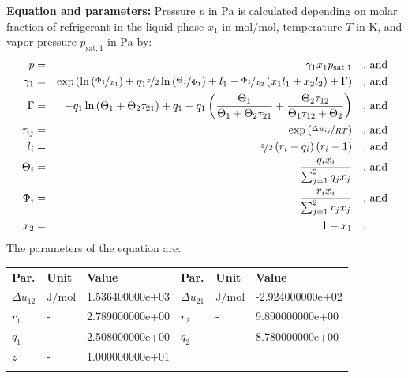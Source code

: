 \textbf{Equation and parameters:}
\newline
%
Pressure $p$ in $\si{\pascal}$ is calculated depending on molar fraction of refrigerant in the liquid phase $x_1$ in $\si{\mole\per\mole}$, temperature $T$ in $\si{\kelvin}$, and vapor pressure $p_\mathrm{sat,1}$ in $\si{\pascal}$ by:
%
\begin{equation*}
\begin{split}
p &=& \gamma_1 x_1 p_\mathrm{sat,1} & \quad\text{, and} \\
\gamma_1 &=& \exp \left( \ln \left( \nicefrac{\Phi_1}{x_1} \right) + q_1 \nicefrac{z}{2} \ln \left( \nicefrac{\Theta_1}{\Phi_1} \right) + l_1 - \nicefrac{\Phi_1}{x_2} \left( x_1 l_1 + x_2 l_2 \right) + \Gamma \right) & \quad\text{, and} \\
\Gamma &=& - q_1 \ln \left( \Theta_1 + \Theta_2 \tau_{21} \right) + q_1 - q_1 \left( \frac{\Theta_1}{\Theta_1 + \Theta_2 \tau_{21}} + \frac{\Theta_2 \tau_{12}}{\Theta_1 \tau_{12} + \Theta_2} \right) & \quad\text{, and} \\
\tau_{ij} &=& \exp \left( \nicefrac{\Delta u_{ij}}{R T} \right) & \quad\text{, and} \\
l_i &=& \nicefrac{z}{2} \left( r_i - q_i \right) \left(r_i - 1 \right) & \quad\text{, and} \\
\Theta_i &=& \frac{q_i x_i}{\sum_{j=1}^{2} q_j x_j} & \quad\text{, and} \\
\Phi_i &=& \frac{r_i x_i}{\sum_{j=1}^{2} r_j x_j} & \quad\text{, and} \\
x_2 &=& 1 - x_1  & \quad\text{.} \\
\end{split}
\end{equation*}
%
The parameters of the equation are:
%
\begin{longtable}[l]{lll|lll}
\toprule
\addlinespace
\textbf{Par.} & \textbf{Unit} & \textbf{Value} &	\textbf{Par.} & \textbf{Unit} & \textbf{Value} \\
\addlinespace
\midrule
\endhead

\bottomrule
\endfoot
\bottomrule
\endlastfoot
\addlinespace

$\Delta u_{12}$ & $\si{\joule\per\mole}$ & 1.536400000e+03 & $\Delta u_{21}$ & $\si{\joule\per\mole}$ & -2.924000000e+02 \\
$r_{1}$ & - & 2.789000000e+00 & $r_{2}$ & - & 9.890000000e+00 \\
$q_{1}$ & - & 2.508000000e+00 & $q_{2}$ & - & 8.780000000e+00 \\
$z$ & - & 1.000000000e+01 & & &  \\

\addlinespace\end{longtable}

